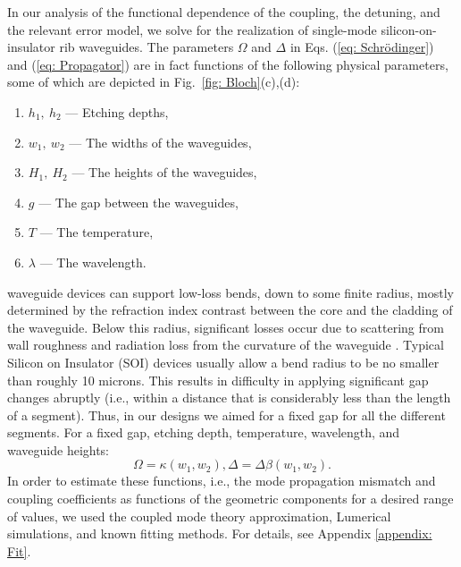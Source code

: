 \documentclass[floatfix,reprint, amsmath,amssymb,aps,superscriptaddress,nofootinbib]{revtex4-2}
\begin{document}
In our analysis of the functional dependence of the coupling, the detuning, and the relevant error model, we solve for the realization of single-mode silicon-on-insulator rib waveguides. The parameters $\Omega$ and $\Delta$ in Eqs. (\ref{eq: Schrödinger}) and (\ref{eq: Propagator}) are in fact functions of the following physical parameters, some of which are depicted in Fig.~\ref{fig: Bloch}(c),(d):
\begin{enumerate}
    \item $h_1, \: h_2$ --- Etching depths,
    \item $w_1,\: w_2$ --- The widths of the waveguides,
    \item $H_1,\: H_2$ --- The heights of the waveguides,
    \item $g$ --- The gap between the waveguides,
    \item $T$ --- The temperature,
    \item $\lambda$ --- The wavelength.
\end{enumerate}
waveguide devices can support low-loss bends, down to some finite radius, mostly determined by the refraction index contrast between the core and the cladding of the waveguide. Below this radius, significant losses occur due to scattering from wall roughness and radiation loss from the curvature of the waveguide \cite{Bahadori2019}. Typical Silicon on Insulator (SOI) devices usually allow a bend radius to be no smaller than roughly 10 microns. This results in difficulty in applying significant gap changes abruptly (i.e., within a distance that is considerably less than the length of a segment). Thus, in our designs we aimed for a fixed gap for all the different segments. For a fixed gap, etching depth, temperature, wavelength, and waveguide heights:
\begin{subequations}
    \begin{equation}
        \Omega=\kappa\left(w_1,w_2\right) ,
    \end{equation}
\begin{equation}
        \Delta=\Delta\beta\left(w_1,w_2\right) .
\end{equation}
\end{subequations}
In order to estimate these functions, i.e., the mode propagation mismatch and coupling coefficients as functions of the geometric components for a desired range of values, we used the coupled mode theory approximation, Lumerical simulations, and known fitting methods. For details, see Appendix \ref{appendix: Fit}.
\end{document}
